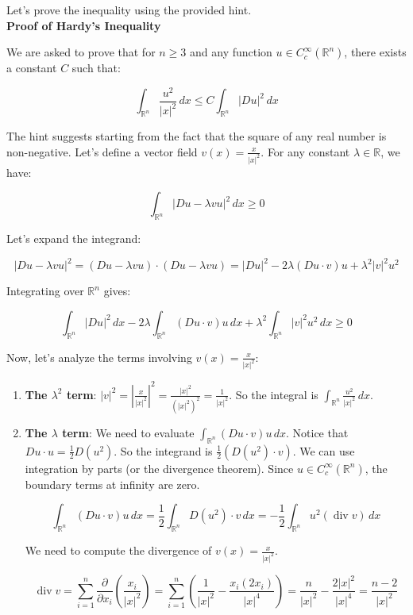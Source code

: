 \documentclass[12pt,a4paper]{report}
\begin{document}
\begin{enumerate}
Let's prove the inequality using the provided hint.\\

\textbf{Proof of Hardy's Inequality}

We are asked to prove that for $n \ge 3$ and any function $u \in C_c^\infty(\mathbb{R}^n)$, there exists a constant $C$ such that:

$$ \int_{\mathbb{R}^n} \frac{u^2}{|x|^2}\,dx \le C\int_{\mathbb{R}^n} |Du|^2\,dx $$

The hint suggests starting from the fact that the square of any real number is non-negative. Let's define a vector field $v(x) = \frac{x}{|x|^2}$. For any constant $\lambda \in \mathbb{R}$, we have:

$$ \int_{\mathbb{R}^n} |Du - \lambda v u|^2 \,dx \ge 0 $$

Let's expand the integrand:

$$ |Du - \lambda v u|^2 = (Du - \lambda v u) \cdot (Du - \lambda v u) = |Du|^2 - 2\lambda (Du \cdot v) u + \lambda^2 |v|^2 u^2 $$

Integrating over $\mathbb{R}^n$ gives:

$$ \int_{\mathbb{R}^n} |Du|^2 \,dx - 2\lambda \int_{\mathbb{R}^n} (Du \cdot v) u \,dx + \lambda^2 \int_{\mathbb{R}^n} |v|^2 u^2 \,dx \ge 0 $$

Now, let's analyze the terms involving $v(x) = \frac{x}{|x|^2}$:

\begin{enumerate}
\item  \textbf{The $\lambda^2$ term}: $|v|^2 = |\frac{x}{|x|^2}|^2 = \frac{|x|^2}{(|x|^2)^2} = \frac{1}{|x|^2}$. So the integral is $\int_{\mathbb{R}^n} \frac{u^2}{|x|^2} \,dx$.

\item \textbf{The $\lambda$ term}: We need to evaluate $\int_{\mathbb{R}^n} (Du \cdot v) u \,dx$. Notice that $Du \cdot u = \frac{1}{2} D(u^2)$. So the integrand is $\frac{1}{2} (D(u^2) \cdot v)$. We can use integration by parts (or the divergence theorem). Since $u \in C_c^\infty(\mathbb{R}^n)$, the boundary terms at infinity are zero.

    $$ \int_{\mathbb{R}^n} (Du \cdot v) u \,dx = \frac{1}{2} \int_{\mathbb{R}^n} D(u^2) \cdot v \,dx = -\frac{1}{2} \int_{\mathbb{R}^n} u^2 (\operatorname{div} v) \,dx $$

    We need to compute the divergence of $v(x) = \frac{x}{|x|^2}$.

    $$ \operatorname{div} v = \sum_{i=1}^n \frac{\partial}{\partial x_i} \left( \frac{x_i}{|x|^2} \right) = \sum_{i=1}^n \left( \frac{1}{|x|^2} - \frac{x_i (2x_i)}{|x|^4} \right) = \frac{n}{|x|^2} - \frac{2|x|^2}{|x|^4} = \frac{n-2}{|x|^2} $$


\end{enumerate}
\end{enumerate}
\end{document}
